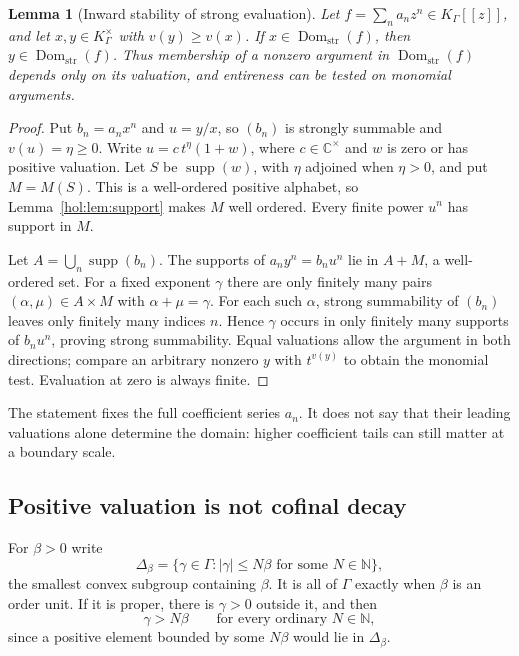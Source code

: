 \documentclass[11pt]{article}
\numberwithin{equation}{section}
\newtheorem{lemma}[theorem]{Lemma}
\theoremstyle{definition}
\theoremstyle{remark}
\newcommand{\C}{\mathbb C}
\newcommand{\N}{\mathbb N}
\newcommand{\K}{K_\Gamma}
\newcommand{\supp}{\operatorname{supp}}
\newcommand{\Dom}{\operatorname{Dom}_{\mathrm{str}}}
\newcommand{\abs}[1]{\lvert#1\rvert}
\begin{document}
\begin{lemma}[Inward stability of strong evaluation]\label{hol:lem:inward}
Let $f=\sum_na_nz^n\in\K[[z]]$, and let $x,y\in\K^\times$ with
$v(y)\ge v(x)$. If $x\in\Dom(f)$, then $y\in\Dom(f)$.
Thus membership of a nonzero argument in $\Dom(f)$ depends only on its
valuation, and entireness can be tested on monomial arguments.
\end{lemma}

\begin{proof}
Put $b_n=a_nx^n$ and $u=y/x$, so $(b_n)$ is strongly summable and
$v(u)=\eta\ge0$. Write $u=c\,t^\eta(1+w)$, where $c\in\C^\times$
and $w$ is zero or has positive valuation. Let $S$ be $\supp(w)$,
with $\eta$ adjoined when $\eta>0$, and put $M=M(S)$.
This is a well-ordered positive alphabet, so Lemma~\ref{hol:lem:support}
makes $M$ well ordered. Every finite power $u^n$ has support in $M$.

Let $A=\bigcup_n\supp(b_n)$. The supports of
$a_ny^n=b_nu^n$ lie in $A+M$, a well-ordered set.
For a fixed exponent $\gamma$ there are only finitely many pairs
$(\alpha,\mu)\in A\times M$ with $\alpha+\mu=\gamma$.
For each such $\alpha$, strong summability of $(b_n)$ leaves only
finitely many indices $n$. Hence $\gamma$ occurs in only finitely many
supports of $b_nu^n$, proving strong summability. Equal valuations allow
the argument in both directions; compare an arbitrary nonzero $y$ with
$t^{v(y)}$ to obtain the monomial test. Evaluation at zero is always finite.
\end{proof}

The statement fixes the full coefficient series $a_n$. It does not say
that their leading valuations alone determine the domain: higher
coefficient tails can still matter at a boundary scale.

\subsection{Positive valuation is not cofinal decay}

For $\beta>0$ write
\begin{equation}\label{hol:eq:delta}
 \Delta_\beta=\{\gamma\in\Gamma:\abs\gamma\le N\beta\text{ for some }N\in\N\},
\end{equation}
the smallest convex subgroup containing $\beta$. It is all of $\Gamma$ exactly
when $\beta$ is an order unit. If it is proper, there is $\gamma>0$ outside
it, and then
\begin{equation}\label{hol:eq:dominates}
 \gamma>N\beta\qquad\text{for every ordinary }N\in\N,
\end{equation}
since a positive element bounded by some $N\beta$ would lie in $\Delta_\beta$.
\end{document}
